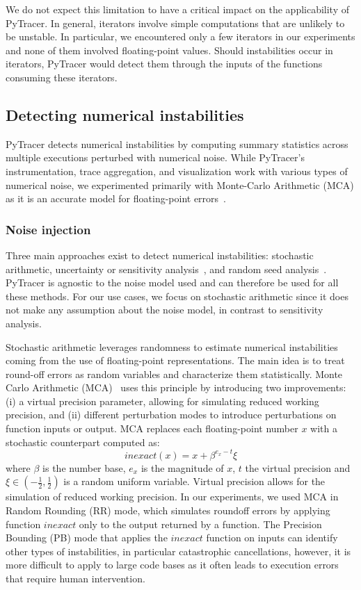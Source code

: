 \documentclass[10pt,journal,compsoc]{IEEEtran}
\newcommand{\pytracer}[0]{PyTracer\xspace}
\DeclareRobustCommand{\add}[1]{\textcolor{ao(english)}{#1}}%
\DeclareRobustCommand{\add}[1]{#1}
\begin{document}
\add{
    We do not expect this limitation to have a critical impact on the
    applicability of \pytracer. 
    In general, iterators involve simple computations that are unlikely to be
    unstable. In particular, we encountered only a few iterators in our
    experiments and none of them involved floating-point values. Should
    instabilities occur in iterators, \pytracer would detect them through the
    inputs of the functions consuming these iterators. 
}

\subsection{Detecting numerical instabilities}

\pytracer detects numerical instabilities by computing summary statistics across
multiple executions perturbed with numerical noise. While \pytracer's
instrumentation, trace aggregation, and visualization work with various types of
numerical noise, we experimented primarily with Monte-Carlo Arithmetic (MCA) as
it is an accurate model for floating-point errors~\cite{verificarlo}.

\subsubsection{Noise injection}
\label{sec:fuzzy}

Three  main  approaches  exist  to  detect  numerical  instabilities:
stochastic  arithmetic,  uncertainty  or  sensitivity analysis~\cite{helton2006survey}, and random
seed analysis~\cite{hellekalek1998good}. \add{PyTracer is agnostic to the noise model used and can therefore
    be used for all these methods}.  For our use cases, we focus on stochastic
arithmetic since it does not make any assumption about the noise model, in
contrast to sensitivity analysis\add{.}

Stochastic arithmetic leverages randomness to estimate numerical instabilities
coming from the use of floating-point representations. The main idea is to treat
round-off errors as random variables and characterize them statistically. Monte 
Carlo Arithmetic (MCA)~\cite{parker1997monte} uses this principle by introducing
two improvements: (i) a virtual precision parameter, allowing for simulating
reduced working precision, and (ii) different perturbation modes to introduce
perturbations on function inputs or output. MCA replaces each floating-point
number $x$ with a stochastic counterpart computed as:
\[
    inexact(x) =  x + \beta^{e_x - t}\xi
\]
where $\beta$ is the number base, $e_x$ is the magnitude of $x$, $t$ the virtual
precision and $\xi \in (-\frac{1}{2},\frac{1}{2})$ is a random uniform variable.
Virtual precision allows for the simulation of reduced working precision.
\add{In our experiments, we used MCA in Random Rounding (RR) mode, which
    simulates roundoff errors by applying function $inexact$ only to the
    output returned by a function. The Precision Bounding (PB) mode that applies
    the $inexact$ function on inputs can
    identify other types of instabilities, in particular catastrophic
    cancellations, however, it is more difficult to apply to large code bases
    as it often leads to execution errors that require human intervention.}
\end{document}

